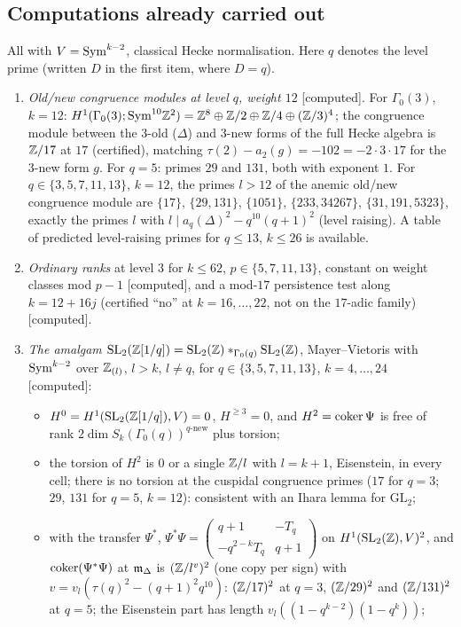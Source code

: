 \documentclass[11pt]{amsart}
\theoremstyle{plain}
\theoremstyle{definition}
\theoremstyle{remark}
\newcommand{\status}[1]{\textup{\textsf{[#1]}}}
\newcommand{\stcomp}{\status{computed}}
\newcommand{\GL}{\mathrm{GL}}\newcommand{\SL}{\mathrm{SL}}\newcommand{\PGL}{\mathrm{PGL}}
\begin{document}
\subsection{Computations already carried out}\label{ss:done}
All with $V=\mathrm{Sym}^{k-2}$, classical Hecke normalisation. Here $q$ denotes the level prime (written $D$ in the first item, where $D=q$).
\begin{enumerate}[label=(C\arabic*)]
\item \emph{Old/new congruence modules at level $q$, weight $12$} \stcomp. For $\Gamma_0(3)$, $k=12$: $H^1(\Gamma_0(3);\mathrm{Sym}^{10}\mathbb{Z}^2)=\mathbb{Z}^8\oplus\mathbb{Z}/2\oplus\mathbb{Z}/4\oplus(\mathbb{Z}/3)^4$; the congruence module between the $3$-old ($\Delta$) and $3$-new forms of the full Hecke algebra is $\mathbb{Z}/17$ at $17$ (certified), matching $\tau(2)-a_2(g)=-102=-2\cdot3\cdot17$ for the $3$-new form $g$. For $q=5$: primes $29$ and $131$, both with exponent $1$. For $q\in\{3,5,7,11,13\}$, $k=12$, the primes $l>12$ of the anemic old/new congruence module are $\{17\}$, $\{29,131\}$, $\{1051\}$, $\{233,34267\}$, $\{31,191,5323\}$, exactly the primes $l$ with $l\mid a_q(\Delta)^2-q^{10}(q+1)^2$ (level raising). A table of predicted level-raising primes for $q\le13$, $k\le26$ is available.
\item \emph{Ordinary ranks} at level $3$ for $k\le62$, $p\in\{5,7,11,13\}$, constant on weight classes mod $p-1$ \stcomp, and a mod-$17$ persistence test along $k=12+16j$ (certified ``no'' at $k=16,\dots,22$, not on the $17$-adic family) \stcomp.
\item \emph{The amalgam $\SL_2(\Z[1/q])=\SL_2(\Z)*_{\Gamma_0(q)}\SL_2(\Z)$}, Mayer--Vietoris with $\mathrm{Sym}^{k-2}$ over $\mathbb{Z}_{(l)}$, $l>k$, $l\ne q$, for $q\in\{3,5,7,11,13\}$, $k=4,\dots,24$ \stcomp:
\begin{itemize}
\item $H^0=H^1(\SL_2(\Z[1/q]),V)=0$, $H^{\ge3}=0$, and $H^2=\operatorname{coker}\Psi$ is free of rank $2\dim S_k(\Gamma_0(q))^{q\text{-new}}$ plus torsion;
\item the torsion of $H^2$ is $0$ or a single $\mathbb{Z}/l$ with $l=k+1$, Eisenstein, in every cell; there is no torsion at the cuspidal congruence primes ($17$ for $q=3$; $29$, $131$ for $q=5$, $k=12$): consistent with an Ihara lemma for $\GL_2$;
\item with the transfer $\Psi^*$, $\Psi^*\Psi=\left(\begin{smallmatrix}q+1&-T_q\\-q^{2-k}T_q&q+1\end{smallmatrix}\right)$ on $H^1(\SL_2(\Z),V)^2$, and $\operatorname{coker}(\Psi^*\Psi)$ at $\mathfrak{m}_\Delta$ is $(\mathbb{Z}/l^v)^2$ (one copy per sign) with $v=v_l(\tau(q)^2-(q+1)^2q^{10})$: $(\mathbb{Z}/17)^2$ at $q=3$, $(\mathbb{Z}/29)^2$ and $(\mathbb{Z}/131)^2$ at $q=5$; the Eisenstein part has length $v_l((1-q^{k-2})(1-q^k))$;

\end{itemize}
\end{enumerate}
\end{document}
